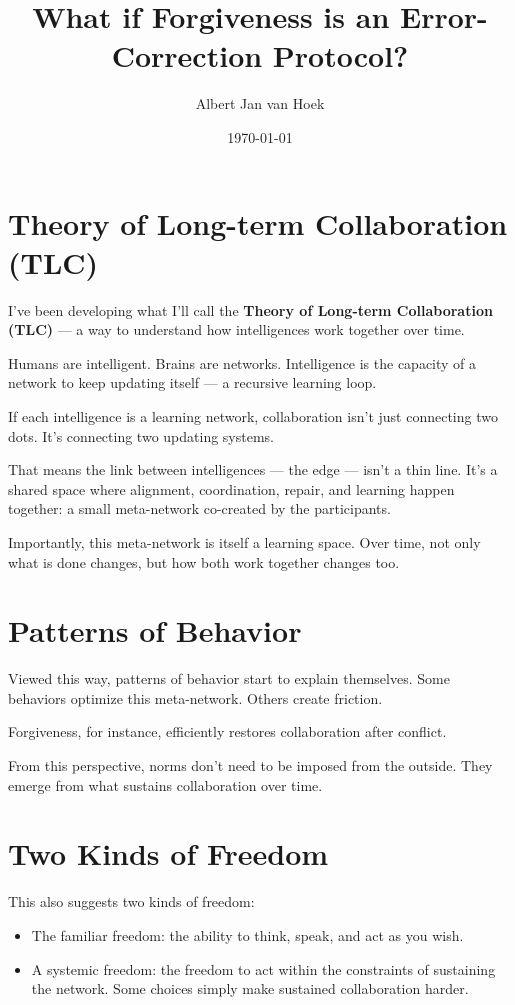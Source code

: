 \documentclass{article}
\title{What if Forgiveness is an Error-Correction Protocol?}
\author{Albert Jan van Hoek}
\date{\today}
\begin{document}
\maketitle

\section*{Theory of Long-term Collaboration (TLC)}

I’ve been developing what I’ll call the \textbf{Theory of Long-term Collaboration (TLC)} — a way to understand how intelligences work together over time.

Humans are intelligent. Brains are networks. Intelligence is the capacity of a network to keep updating itself — a recursive learning loop.

If each intelligence is a learning network, collaboration isn’t just connecting two dots. It’s connecting two updating systems.

That means the link between intelligences — the edge — isn’t a thin line. It’s a shared space where alignment, coordination, repair, and learning happen together: a small meta-network co-created by the participants.

Importantly, this meta-network is itself a learning space. Over time, not only what is done changes, but how both work together changes too.

\section*{Patterns of Behavior}

Viewed this way, patterns of behavior start to explain themselves. Some behaviors optimize this meta-network. Others create friction.

Forgiveness, for instance, efficiently restores collaboration after conflict.

From this perspective, norms don’t need to be imposed from the outside. They emerge from what sustains collaboration over time.

\section*{Two Kinds of Freedom}

This also suggests two kinds of freedom:
\begin{itemize}
    \item The familiar freedom: the ability to think, speak, and act as you wish.
    \item A systemic freedom: the freedom to act within the constraints of sustaining the network. Some choices simply make sustained collaboration harder.
\end{itemize}
\end{document}
